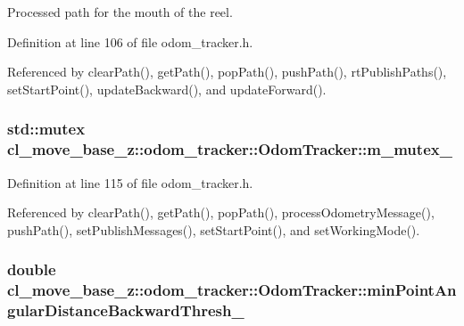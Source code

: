 Processed path for the mouth of the reel. 



Definition at line 106 of file odom\+\_\+tracker.\+h.



Referenced by clear\+Path(), get\+Path(), pop\+Path(), push\+Path(), rt\+Publish\+Paths(), set\+Start\+Point(), update\+Backward(), and update\+Forward().

\subsubsection[{\texorpdfstring{m\+\_\+mutex\+\_\+}{m_mutex_}}]{\setlength{\rightskip}{0pt plus 5cm}std\+::mutex cl\+\_\+move\+\_\+base\+\_\+z\+::odom\+\_\+tracker\+::\+Odom\+Tracker\+::m\+\_\+mutex\+\_\+\hspace{0.3cm}{\ttfamily [protected]}}\hypertarget{classcl__move__base__z_1_1odom__tracker_1_1OdomTracker_aa371639e1eee269273dec8d3ab9dba0f}{}\label{classcl__move__base__z_1_1odom__tracker_1_1OdomTracker_aa371639e1eee269273dec8d3ab9dba0f}


Definition at line 115 of file odom\+\_\+tracker.\+h.



Referenced by clear\+Path(), get\+Path(), pop\+Path(), process\+Odometry\+Message(), push\+Path(), set\+Publish\+Messages(), set\+Start\+Point(), and set\+Working\+Mode().

\subsubsection[{\texorpdfstring{min\+Point\+Angular\+Distance\+Backward\+Thresh\+\_\+}{minPointAngularDistanceBackwardThresh_}}]{\setlength{\rightskip}{0pt plus 5cm}double cl\+\_\+move\+\_\+base\+\_\+z\+::odom\+\_\+tracker\+::\+Odom\+Tracker\+::min\+Point\+Angular\+Distance\+Backward\+Thresh\+\_\+\hspace{0.3cm}{\ttfamily [protected]}}\hypertarget{classcl__move__base__z_1_1odom__tracker_1_1OdomTracker_a2d166d65e97d4aa7851c45fd81985a85}{}\label{classcl__move__base__z_1_1odom__tracker_1_1OdomTracker_a2d166d65e97d4aa7851c45fd81985a85}


